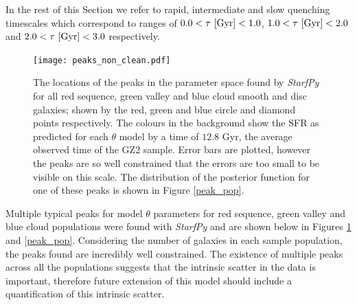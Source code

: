 \documentclass{mn2e}
\begin{document}
In the rest of this Section we refer to rapid, intermediate and slow quenching timescales which correspond to ranges of $0.0 < \tau ~\rm{[Gyr]} < 1.0$, $1.0 < \tau ~\rm{[Gyr]} < 2.0$ and $2.0 < \tau ~\rm{[Gyr]} < 3.0$ respectively.
 
\begin{figure}
\texttt{[image: peaks\_non\_clean.pdf]}
\caption{The locations of the peaks in the parameter space found by \emph{StarfPy} for all red sequence, green valley and blue cloud smooth and disc galaxies; shown by the red, green and blue circle and diamond points respectively. The colours in the background show the SFR as predicted for each $\theta$ model by a time of $12.8$ Gyr, the average observed time of the GZ2 sample. Error bars are plotted, however the peaks are so well constrained that the errors are too small to be visible on this scale. The distribution of the posterior function for one of these peaks is shown in Figure \ref{peak_pop}.}
\label{peaks_non}
\end{figure}


Multiple typical peaks for model $\theta$ parameters for red sequence, green valley and blue cloud populations were found with \emph{StarfPy} and are shown below in Figures \ref{peaks_non} and \ref{peak_pop}.  Considering the number of galaxies in each sample population, the peaks found are incredibly well constrained. The existence of multiple peaks across all the populations suggests that the intrinsic scatter in the data is important, therefore future extension of this model should include a quantification of this intrinsic scatter.  
\end{document}
